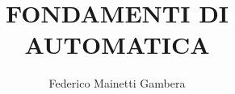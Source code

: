   
\title{FONDAMENTI DI AUTOMATICA}
\author{Federico Mainetti Gambera}
\usepackage{amsmath}
\usepackage{amssymb}
\usepackage{graphicx}
\usepackage[italian]{babel}
\usepackage{import}
\usepackage{xifthen}
\usepackage{pdfpages}
\usepackage{transparent}
\usepackage{xcolor}
\usepackage[a4paper,left=35mm,top=26mm,right=26mm,bottom=15mm]{geometry}
\usepackage{color}
\usepackage{tcolorbox}
\usepackage{hyperref}
\renewcommand{\familydefault}{\sfdefault}
\newenvironment{rcases}
  {\left.\begin{aligned}}
  {\end{aligned}\right\rbrace}
\newcommand{\incfig}[1]{%
    \def\svgwidth{\columnwidth}
    {#1.pdf_tex}
}